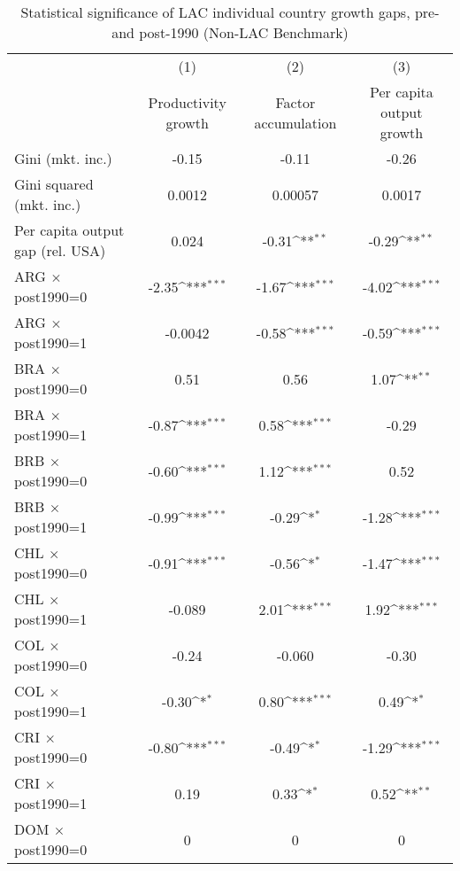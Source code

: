 \begin{sidewaystable}[htbp]\centering
\def\sym#1{\ifmmode^{#1}\else\(^{#1}\)\fi}
\caption{Statistical significance of LAC individual country growth gaps, pre- and post-1990 (Non-LAC Benchmark)}
\begin{tabular}{l*{3}{c}}
\toprule
                &\multicolumn{1}{c}{(1)}&\multicolumn{1}{c}{(2)}&\multicolumn{1}{c}{(3)}\\
                &\multicolumn{1}{c}{Productivity growth}&\multicolumn{1}{c}{Factor accumulation}&\multicolumn{1}{c}{Per capita output growth}\\
\midrule
Gini (mkt. inc.)&    -0.15         &    -0.11         &    -0.26         \\
Gini squared (mkt. inc.)&   0.0012         &  0.00057         &   0.0017         \\
Per capita output gap (rel. USA)&    0.024         &    -0.31\sym{**} &    -0.29\sym{**} \\
ARG $\times$ post1990=0&    -2.35\sym{***}&    -1.67\sym{***}&    -4.02\sym{***}\\
ARG $\times$ post1990=1&  -0.0042         &    -0.58\sym{***}&    -0.59\sym{***}\\
BRA $\times$ post1990=0&     0.51         &     0.56         &     1.07\sym{**} \\
BRA $\times$ post1990=1&    -0.87\sym{***}&     0.58\sym{***}&    -0.29         \\
BRB $\times$ post1990=0&    -0.60\sym{***}&     1.12\sym{***}&     0.52         \\
BRB $\times$ post1990=1&    -0.99\sym{***}&    -0.29\sym{*}  &    -1.28\sym{***}\\
CHL $\times$ post1990=0&    -0.91\sym{***}&    -0.56\sym{*}  &    -1.47\sym{***}\\
CHL $\times$ post1990=1&   -0.089         &     2.01\sym{***}&     1.92\sym{***}\\
COL $\times$ post1990=0&    -0.24         &   -0.060         &    -0.30         \\
COL $\times$ post1990=1&    -0.30\sym{*}  &     0.80\sym{***}&     0.49\sym{*}  \\
CRI $\times$ post1990=0&    -0.80\sym{***}&    -0.49\sym{*}  &    -1.29\sym{***}\\
CRI $\times$ post1990=1&     0.19         &     0.33\sym{*}  &     0.52\sym{**} \\
DOM $\times$ post1990=0&        0         &        0         &        0         \\

\end{tabular}
\end{sidewaystable}
